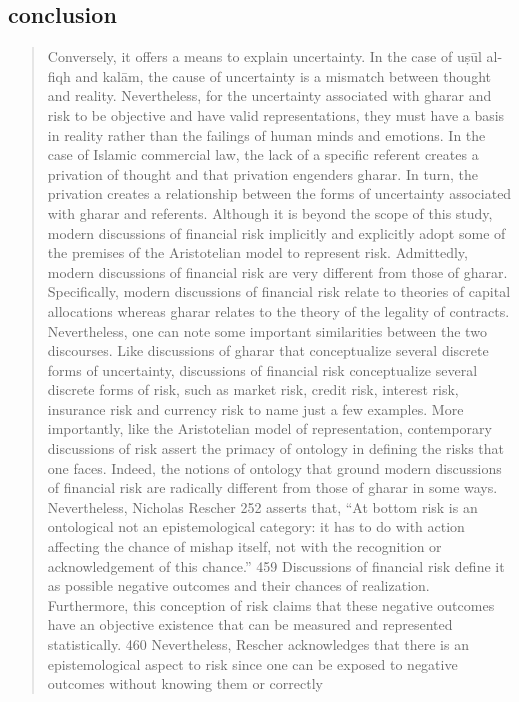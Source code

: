 \subsection{conclusion}
\begin{quote}
    Conversely, it offers a means to explain uncertainty. In the case of uṣūl al-fiqh and kalām,
the cause of uncertainty is a mismatch between thought and reality. Nevertheless, for the
uncertainty associated with gharar and risk to be objective and have valid
representations, they must have a basis in reality rather than the failings of human minds
and emotions. In the case of Islamic commercial law, the lack of a specific referent
creates a privation of thought and that privation engenders gharar. In turn, the privation
creates a relationship between the forms of uncertainty associated with gharar and
referents.
Although it is beyond the scope of this study, modern discussions of financial risk
implicitly and explicitly adopt some of the premises of the Aristotelian model to
represent risk. Admittedly, modern discussions of financial risk are very different from
those of gharar. Specifically, modern discussions of financial risk relate to theories of
capital allocations whereas gharar relates to the theory of the legality of contracts.
Nevertheless, one can note some important similarities between the two discourses. Like
discussions of gharar that conceptualize several discrete forms of uncertainty,
discussions of financial risk conceptualize several discrete forms of risk, such as market
risk, credit risk, interest risk, insurance risk and currency risk to name just a few
examples.
More importantly, like the Aristotelian model of representation, contemporary
discussions of risk assert the primacy of ontology in defining the risks that one faces.
Indeed, the notions of ontology that ground modern discussions of financial risk are
radically different from those of gharar in some ways. Nevertheless, Nicholas Rescher
252
asserts that, “At bottom risk is an ontological not an epistemological category: it has to do
with action affecting the chance of mishap itself, not with the recognition or
acknowledgement of this chance.” 459 Discussions of financial risk define it as possible
negative outcomes and their chances of realization. Furthermore, this conception of risk
claims that these negative outcomes have an objective existence that can be measured and
represented statistically. 460
Nevertheless, Rescher acknowledges that there is an epistemological aspect to
risk since one can be exposed to negative outcomes without knowing them or correctly

\end{quote}
